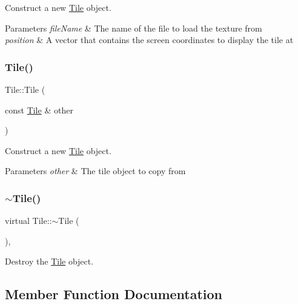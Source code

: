 Construct a new \mbox{\hyperlink{classTile}{Tile}} object. 


\begin{DoxyParams}{Parameters}
{\em file\+Name} & The name of the file to load the texture from \\
\hline
{\em position} & A vector that contains the screen coordinates to display the tile at \\
\hline
\end{DoxyParams}
\mbox{\label{classTile_a480e50775203166df068f0cfc889d91b}} 
\subsubsection{\texorpdfstring{Tile()}{Tile()}\hspace{0.1cm}{\footnotesize\ttfamily [3/3]}}
{\footnotesize\ttfamily Tile\+::\+Tile (\begin{DoxyParamCaption}\item[{const \mbox{\hyperlink{classTile}{Tile}} \&}]{other }\end{DoxyParamCaption})}



Construct a new \mbox{\hyperlink{classTile}{Tile}} object. 


\begin{DoxyParams}{Parameters}
{\em other} & The tile object to copy from \\
\hline
\end{DoxyParams}
\mbox{\label{classTile_aecd90209e168f26bcdf36c2e445f424a}} 
\subsubsection{\texorpdfstring{$\sim$Tile()}{~Tile()}}
{\footnotesize\ttfamily virtual Tile\+::$\sim$\+Tile (\begin{DoxyParamCaption}{ }\end{DoxyParamCaption})\hspace{0.3cm}{\ttfamily [virtual]}, {\ttfamily [default]}}



Destroy the \mbox{\hyperlink{classTile}{Tile}} object. 



\subsection{Member Function Documentation}
\mbox{\label{classTile_ab83f64c1d7fdeba49f9d84bd1a33e612}} 
